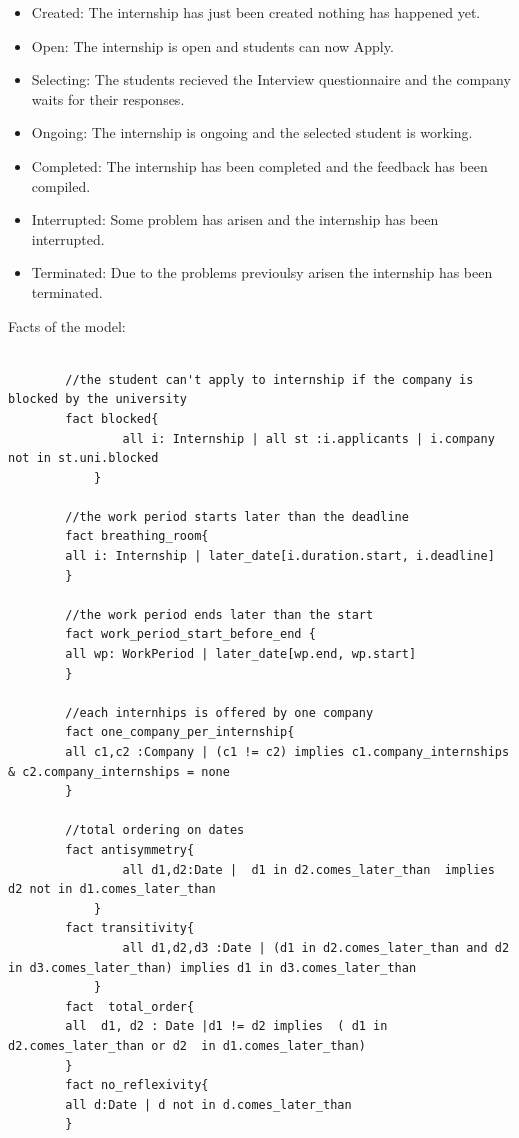 \begin{itemize}
    \item Created: The internship has just been created nothing has happened yet.
    \item Open: The internship is open and students can now Apply.
    \item Selecting: The students recieved the Interview questionnaire and the company waits for their responses.
    \item Ongoing: The internship is ongoing and the selected student is working.
    \item Completed: The internship has been completed and the feedback has been compiled.
    \item Interrupted: Some problem has arisen and the internship has been interrupted.
    \item Terminated: Due to the problems previoulsy arisen the internship has been terminated. %
\end{itemize}

\par Facts of the model:

\begin{lstlisting}[language=Alloy]
                  
        //the student can't apply to internship if the company is blocked by the university
        fact blocked{
                all i: Internship | all st :i.applicants | i.company not in st.uni.blocked
            }
        
        //the work period starts later than the deadline
        fact breathing_room{
        all i: Internship | later_date[i.duration.start, i.deadline]
        }
        
        //the work period ends later than the start
        fact work_period_start_before_end {
        all wp: WorkPeriod | later_date[wp.end, wp.start]
        }
        
        //each internhips is offered by one company
        fact one_company_per_internship{
        all c1,c2 :Company | (c1 != c2) implies c1.company_internships & c2.company_internships = none
        }
        
        //total ordering on dates
        fact antisymmetry{
                all d1,d2:Date |  d1 in d2.comes_later_than  implies d2 not in d1.comes_later_than
            }
        fact transitivity{
                all d1,d2,d3 :Date | (d1 in d2.comes_later_than and d2 in d3.comes_later_than) implies d1 in d3.comes_later_than
            }
        fact  total_order{
        all  d1, d2 : Date |d1 != d2 implies  ( d1 in d2.comes_later_than or d2  in d1.comes_later_than)
        }
        fact no_reflexivity{
        all d:Date | d not in d.comes_later_than
        }
        
\end{lstlisting}

